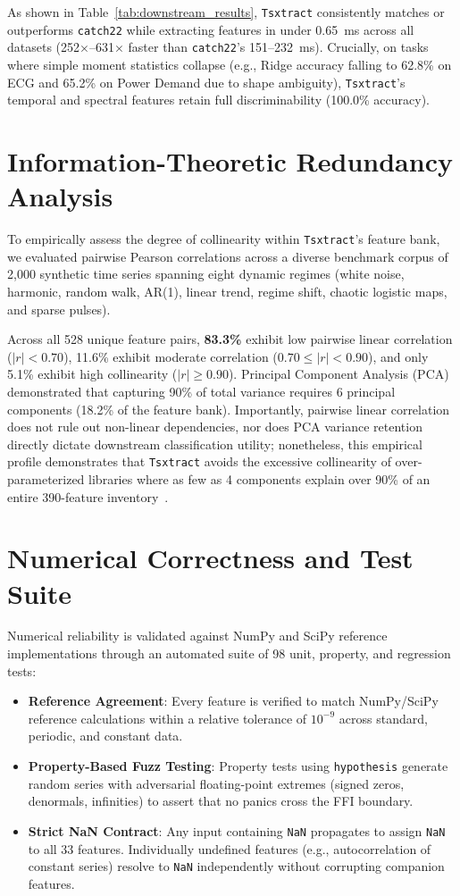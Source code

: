 \documentclass[conference]{IEEEtran}
\newcommand{\tsxtract}{\texttt{Tsxtract}}
\newcommand{\catchtwentytwo}{\texttt{catch22}}
\begin{document}
As shown in Table~\ref{tab:downstream_results}, \tsxtract{} consistently matches or outperforms \catchtwentytwo{} while extracting features in under 0.65~ms across all datasets (252$\times$--631$\times$ faster than \catchtwentytwo{}'s 151--232~ms). Crucially, on tasks where simple moment statistics collapse (e.g., Ridge accuracy falling to 62.8\% on ECG and 65.2\% on Power Demand due to shape ambiguity), \tsxtract{}'s temporal and spectral features retain full discriminability (100.0\% accuracy).

\section{Information-Theoretic Redundancy Analysis}
\label{sec:redundancy}
To empirically assess the degree of collinearity within \tsxtract{}'s feature bank, we evaluated pairwise Pearson correlations across a diverse benchmark corpus of 2,000 synthetic time series spanning eight dynamic regimes (white noise, harmonic, random walk, AR(1), linear trend, regime shift, chaotic logistic maps, and sparse pulses).

Across all 528 unique feature pairs, \textbf{83.3\%} exhibit low pairwise linear correlation ($|r| < 0.70$), 11.6\% exhibit moderate correlation ($0.70 \le |r| < 0.90$), and only 5.1\% exhibit high collinearity ($|r| \ge 0.90$). Principal Component Analysis (PCA) demonstrated that capturing 90\% of total variance requires 6 principal components (18.2\% of the feature bank). Importantly, pairwise linear correlation does not rule out non-linear dependencies, nor does PCA variance retention directly dictate downstream classification utility; nonetheless, this empirical profile demonstrates that \tsxtract{} avoids the excessive collinearity of over-parameterized libraries where as few as 4 components explain over 90\% of an entire 390-feature inventory~\cite{barandas2020tsfel}.

\section{Numerical Correctness and Test Suite}
\label{sec:correctness}
Numerical reliability is validated against NumPy and SciPy reference implementations through an automated suite of 98 unit, property, and regression tests:
\begin{itemize}
    \item \textbf{Reference Agreement}: Every feature is verified to match NumPy/SciPy reference calculations within a relative tolerance of $10^{-9}$ across standard, periodic, and constant data.
    \item \textbf{Property-Based Fuzz Testing}: Property tests using \texttt{hypothesis} generate random series with adversarial floating-point extremes (signed zeros, denormals, infinities) to assert that no panics cross the FFI boundary.
    \item \textbf{Strict NaN Contract}: Any input containing \texttt{NaN} propagates to assign \texttt{NaN} to all 33 features. Individually undefined features (e.g., autocorrelation of constant series) resolve to \texttt{NaN} independently without corrupting companion features.
\end{itemize}
\end{document}
